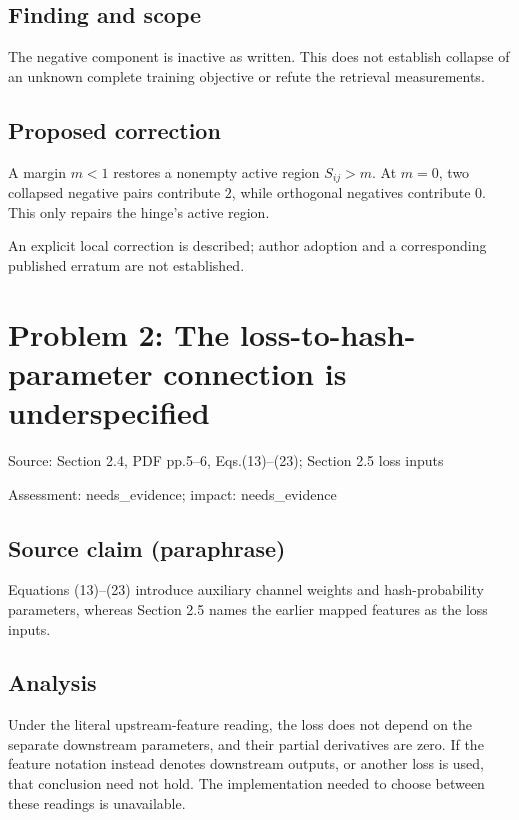 \documentclass[11pt]{article}
\begin{document}
\subsection*{Finding and scope}

The negative component is inactive as written. This does not establish collapse of an unknown complete training objective or refute the retrieval measurements.

\subsection*{Proposed correction}

A margin \(m<1\) restores a nonempty active region \(S_{ij}>m\). At \(m=0\), two collapsed negative pairs contribute \(2\), while orthogonal negatives contribute \(0\). This only repairs the hinge’s active region.

An explicit local correction is described; author adoption and a corresponding published erratum are not established.

\section*{Problem 2: The loss-to-hash-parameter connection is underspecified}

Source: Section 2.4, PDF pp.5–6, Eqs.(13)–(23); Section 2.5 loss inputs

Assessment: needs\_evidence; impact: needs\_evidence

\subsection*{Source claim (paraphrase)}

Equations (13)–(23) introduce auxiliary channel weights and hash-probability parameters, whereas Section 2.5 names the earlier mapped features as the loss inputs.

\subsection*{Analysis}

Under the literal upstream-feature reading, the loss does not depend on the separate downstream parameters, and their partial derivatives are zero. If the feature notation instead denotes downstream outputs, or another loss is used, that conclusion need not hold. The implementation needed to choose between these readings is unavailable.
\end{document}
